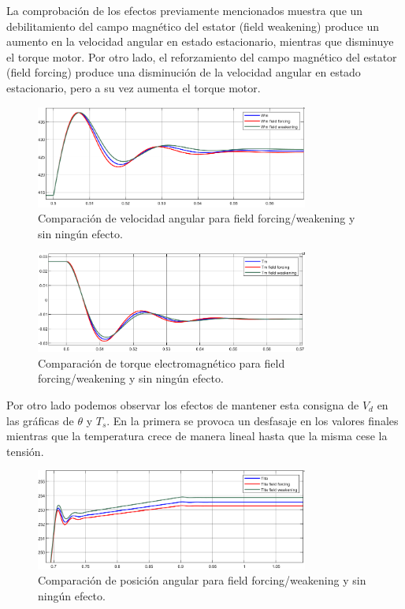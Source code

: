 \documentclass{article}
\begin{document}
La comprobación de los efectos previamente mencionados muestra que un debilitamiento del campo 
magnético del estator (field weakening) produce un aumento en la velocidad angular en estado 
estacionario, mientras que disminuye el torque motor. Por otro lado, el reforzamiento del campo 
magnético del estator (field forcing) produce una disminución de la velocidad angular en estado 
estacionario, pero a su vez aumenta el torque motor.

\begin{figure}[H]
    \centering
    \includegraphics[width=0.8\textwidth]{5.1.6_d4.png}
    \caption{Comparación de velocidad angular para field forcing/weakening y sin ningún efecto.}
\end{figure}

\begin{figure}[H]
    \centering
    \includegraphics[width=0.8\textwidth]{5.1.6_d5.png}
    \caption{Comparación de torque electromagnético para field forcing/weakening y sin ningún efecto.}
\end{figure}

Por otro lado podemos observar los efectos de mantener esta consigna de $V_d$ en las gráficas de 
$\theta$ y $T_s$. En la primera se provoca un desfasaje en los valores finales mientras que la 
temperatura crece de manera lineal hasta que la misma cese la tensión.

\begin{figure}[H]
    \centering
    \includegraphics[width=0.8\textwidth]{5.1.6_d6.png}
    \caption{Comparación de posición angular para field forcing/weakening y sin ningún efecto.}
\end{figure}
\end{document}
